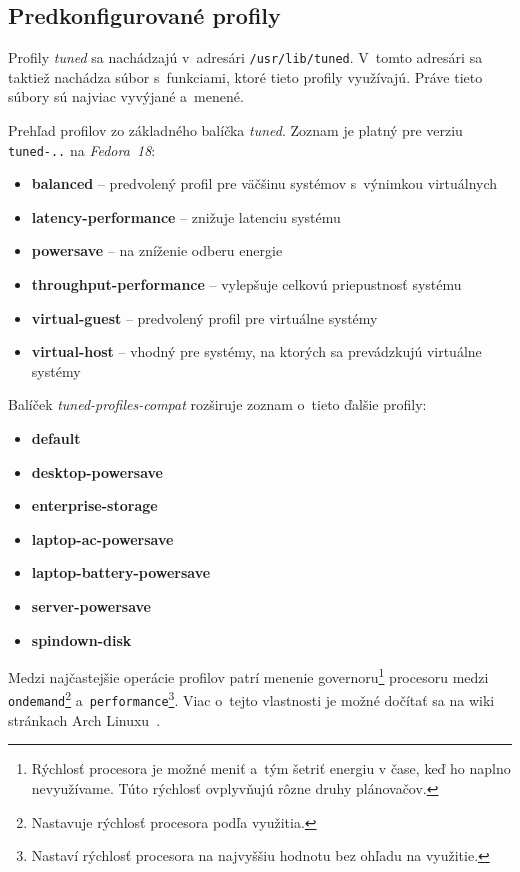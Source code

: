 %
%

\subsection{Predkonfigurované profily}
\label{sec:prehladProfilov}

Profily \emph{tuned} sa nachádzajú v~adresári \texttt{/usr/lib/tuned}. V~tomto
adresári sa taktiež nachádza súbor s~funkciami, ktoré tieto profily využívajú.
Práve tieto súbory sú najviac vyvýjané a~menené.

Prehľad profilov zo základného balíčka \emph{tuned}. Zoznam je platný pre
verziu \texttt{tuned-..} na \emph{Fedora~18}:

\begin{itemize}
    \item \textbf{balanced} -- predvolený profil pre väčšinu systémov s~výnimkou virtuálnych
    \item \textbf{latency-performance} -- znižuje latenciu systému
    \item \textbf{powersave} -- na zníženie odberu energie
    \item \textbf{throughput-performance} -- vylepšuje celkovú priepustnosť systému 
    \item \textbf{virtual-guest} -- predvolený profil pre virtuálne systémy
    \item \textbf{virtual-host} -- vhodný pre systémy, na ktorých sa prevádzkujú virtuálne systémy
\end{itemize}

Balíček \emph{tuned-profiles-compat} rozširuje zoznam o~tieto ďalšie profily:

\begin{itemize}
    \item \textbf{default}
    \item \textbf{desktop-powersave}
    \item \textbf{enterprise-storage}
    \item \textbf{laptop-ac-powersave}
    \item \textbf{laptop-battery-powersave}
    \item \textbf{server-powersave}
    \item \textbf{spindown-disk}
\end{itemize}

Medzi najčastejšie operácie profilov patrí menenie governoru\footnote{Rýchlosť
procesora je možné meniť a~tým šetriť energiu v čase, keď ho naplno
nevyužívame. Túto rýchlosť ovplyvňujú rôzne druhy plánovačov.} procesoru medzi
\texttt{ondemand}\footnote{Nastavuje rýchlosť procesora podľa využitia.}
a~\texttt{performance}\footnote{Nastaví rýchlosť procesora na najvyššiu hodnotu
bez ohľadu na využitie.}. Viac o~tejto vlastnosti je možné dočítať sa na wiki
stránkach Arch Linuxu~\cite{arch:governor}.

